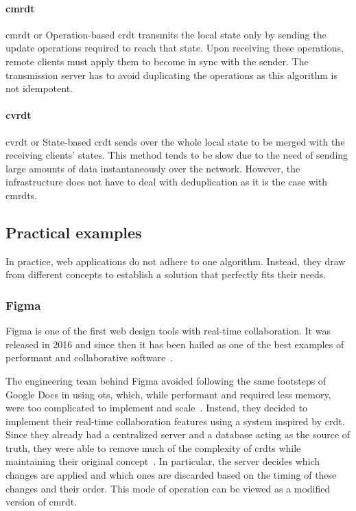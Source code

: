 \begin{toexclude}
	\paragraph{\acrshort{cmrdt}}

	\acrlong{cmrdt} or Operation-based \acrshort{crdt} transmits the local state only by sending the update operations required to reach that state.
	Upon receiving these operations, remote clients must apply them to become in sync with the sender. The transmission server has to avoid duplicating the operations as this algorithm is not idempotent.

	\paragraph{\acrshort{cvrdt}}

	\acrlong{cvrdt} or State-based \acrshort{crdt} sends over the whole local state to be merged with the receiving clients' states. This method tends to be slow due to the need of sending large amounts of data instantaneously over the network. However, the infrastructure does not have to deal with deduplication as it is the case with \acrshort{cmrdt}s.

	\subsection{Practical examples}

	In practice, web applications do not adhere to one algorithm.
	Instead, they draw from different concepts to establish a solution that perfectly fits their needs.

	\subsubsection{Figma}


	Figma is one of the first web design tools with real-time collaboration.
	It was released in 2016 and since then it has been hailed as one of the best examples of performant and collaborative software~\autocite{tools_2020_nodate}.

	The engineering team behind Figma avoided following the same footsteps of Google Docs in using \acrshort{ot}s, which, while performant and required less memory, were too complicated to implement and scale~\autocite{wallace_how_nodate}.
	Instead, they decided to implement their real-time collaboration features using a system inspired by \acrshort{crdt}.
	Since they already had a centralized server and a database acting as the source of truth, they were able to remove much of the complexity of \acrshort{crdt}s while maintaining their original concept~\autocite{wallace_how_nodate}.
	In particular, the server decides which changes are applied and which ones are discarded based on the timing of these changes and their order.
	This mode of operation can be viewed as a modified version of \acrshort{cmrdt}.


\end{toexclude}
